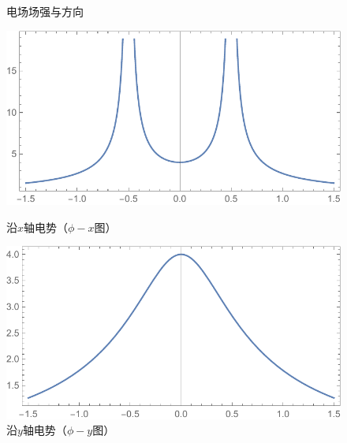 \begin{figure}[H]
\begin{minipage}[b]{0.4\linewidth}
\caption{电场场强与方向\protect \footnotemark}
\end{minipage}
\end{figure}

\begin{figure}[H]
\begin{minipage}[b]{0.4\linewidth}
\centering
\includegraphics[width=\textwidth]{pic_data/T/phix.pdf}
\caption{沿$x$轴电势（$\phi - x$图）}
\end{minipage}
\hfill
\begin{minipage}[b]{0.4\linewidth}
\centering
\includegraphics[width=\textwidth]{pic_data/T/phiy.pdf}
\caption{沿$y$轴电势（$\phi - y$图）}
\end{minipage}
\end{figure}

